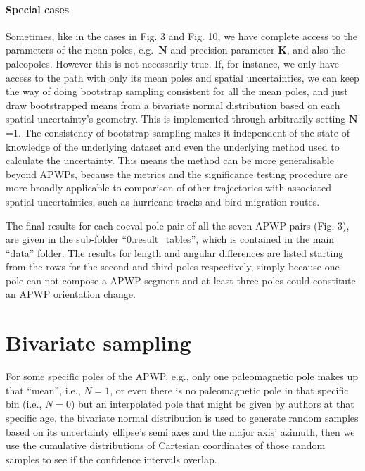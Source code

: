 \paragraph{Special cases} Sometimes, like in the cases in Fig. 3 and Fig. 10, we
have complete access to the parameters of the mean poles, e.g.\ $\mathbf{N}$ and
precision parameter $\mathbf{K}$, and also the paleopoles. However this is not
necessarily true. If, for instance, we only have access to the path with only
its mean poles and spatial uncertainties, we can keep the way of doing bootstrap
sampling consistent for all the mean poles, and just draw bootstrapped means
from a bivariate normal distribution based on each spatial uncertainty's
geometry. This is implemented through arbitrarily setting $\mathbf{N}$=1. The
consistency of bootstrap sampling makes it independent of the state of knowledge
of the underlying dataset and even the underlying method used to calculate the
uncertainty. This means the method can be more generalisable beyond APWPs,
because the metrics and the significance testing procedure are more broadly
applicable to comparison of other trajectories with associated spatial
uncertainties, such as hurricane tracks and bird migration routes.

The final results for each coeval pole pair of all the seven APWP pairs (Fig. 3),
are given in the sub-folder ``0.result\_tables'', which is contained in the main
``data'' folder. The results for length and angular differences are listed
starting from the rows for the second and third poles respectively, simply
because one pole can not compose a APWP segment and at least three poles could
constitute an APWP orientation change.

\section{Bivariate sampling}\label{sec:biv}
For some specific poles of the APWP, e.g., only one paleomagnetic pole makes up
that ``mean'', i.e., $N=1$, or even there is no paleomagnetic pole in that
specific bin (i.e., $N=0$) but an interpolated pole that might be given by
authors at that specific age, the bivariate normal distribution is used to
generate random samples based on its uncertainty ellipse's semi axes and the
major axis' azimuth, then we use the cumulative distributions of Cartesian
coordinates of those random samples to see if the confidence intervals overlap.

